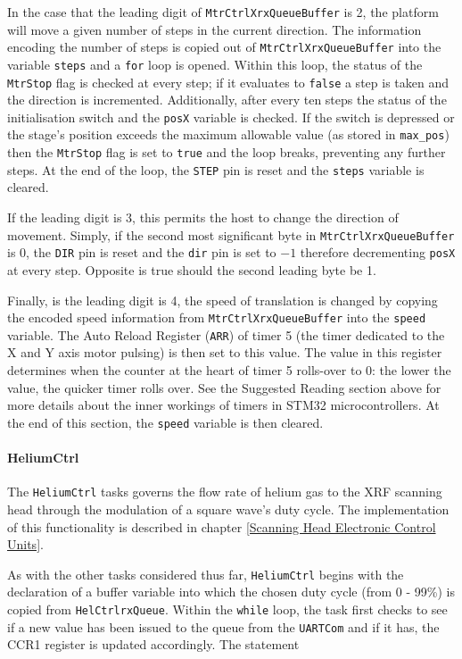 In the case that the leading digit of \verb|MtrCtrlXrxQueueBuffer| is 2, the platform will move a given number of steps in the current direction. The information encoding the number of steps is copied out of \verb|MtrCtrlXrxQueueBuffer| into the variable \verb|steps| and a \verb|for| loop is opened. Within this loop, the status of the \verb|MtrStop| flag is checked at every step; if it evaluates to \verb|false| a step is taken and the direction is incremented. Additionally, after every ten steps the status of the initialisation switch and the \verb|posX| variable is checked. If the switch is depressed or the stage's position exceeds the maximum allowable value (as stored in \verb|max_pos|) then the \verb|MtrStop| flag is set to \verb|true| and the loop breaks, preventing any further steps. At the end of the loop, the \verb|STEP| pin is reset and the \verb|steps| variable is cleared.

If the leading digit is 3, this permits the host to change the direction of movement. Simply, if the second most significant byte in \verb|MtrCtrlXrxQueueBuffer| is 0, the \verb|DIR| pin is reset and the \verb|dir| pin is set to $-1$ therefore decrementing \verb|posX| at every step. Opposite is true should the second leading byte be 1.

Finally, is the leading digit is 4, the speed of translation is changed by copying the encoded speed information from \verb|MtrCtrlXrxQueueBuffer| into the \verb|speed| variable. The Auto Reload Register (\verb|ARR|) of timer 5 (the timer dedicated to the X and Y axis motor pulsing) is then set to this value. The value in this register determines when the counter at the heart of timer 5 rolls-over to 0: the lower the value, the quicker timer rolls over. See the Suggested Reading section above for more details about the inner workings of timers in STM32 microcontrollers. At the end of this section, the \verb|speed| variable is then cleared.

\paragraph{HeliumCtrl}

The \verb|HeliumCtrl| tasks governs the flow rate of helium gas to the XRF scanning head through the modulation of a square wave's duty cycle. The implementation of this functionality is described in chapter \ref{Scanning Head Electronic Control Units}.

As with the other tasks considered thus far, \verb|HeliumCtrl| begins with the declaration of a buffer variable into which the chosen duty cycle (from 0 - 99\%) is copied from \verb|HelCtrlrxQueue|. Within the \verb|while| loop, the task first checks to see if a new value has been issued to the queue from the \verb|UARTCom| and if it has, the CCR1 register is updated accordingly. The statement

